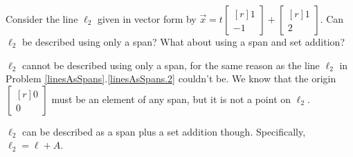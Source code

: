 \documentclass{problemset}
\newcommand{\mat}[1]{\begin{bmatrix*}[r]#1\end{bmatrix*}}
\begin{document}
\begin{parts}
\begin{solution}
			\end{solution}
		\item Consider the line $\ell_2$ given in vector form by $\vec x=t\mat{1\\-1}+\mat{1\\2}$.
			Can $\ell_2$ be described using only a span? What about using a span
			and set addition?
			\begin{solution}
				$\ell_2$ cannot be described using only a span, for the same reason
				as the line $\ell_2$ in Problem \ref{linesAsSpans}.\ref{linesAsSpans.2}
				couldn't be. We know that the origin $\mat{0\\0}$ must be an element
				of any span, but it is not a point on $\ell_2$.

				$\ell_2$ can be described as a span plus a set addition though.
				Specifically, $\ell_2=\ell + A$.
			\end{solution}
	\end{parts}
\end{document}
